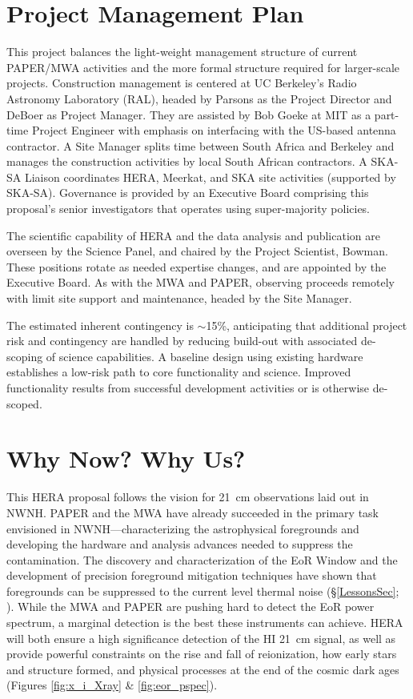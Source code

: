 \documentclass[preprint]{aastex}
\def\HI{{H{\small I }}}
\begin{document}
\vspace{-0.25in}
\section{Project Management Plan}
\label{PMPsec}

This project balances the light-weight management structure of current PAPER/MWA
activities and the more formal structure required for larger-scale projects.
Construction management is centered at UC Berkeley's Radio Astronomy Laboratory
(RAL), headed by Parsons as the Project Director and DeBoer as
Project Manager. They are assisted by Bob Goeke at MIT as a part-time
Project Engineer with emphasis on interfacing with the US-based
antenna contractor.  A Site Manager splits time between South Africa
and Berkeley and manages the construction activities by local South African
contractors. A SKA-SA Liaison coordinates HERA, Meerkat, and SKA site
activities (supported by SKA-SA). Governance is provided by an Executive Board comprising
this proposal's senior investigators that operates using
super-majority policies. 

The scientific capability of HERA and the data analysis and publication are
overseen by the Science Panel, and chaired by the Project Scientist, Bowman. These
positions rotate as needed expertise changes, and are appointed by the
Executive Board.  As with the MWA and PAPER, observing
proceeds remotely with limit site support
and maintenance, headed by the Site Manager.

The estimated inherent contingency is $\sim$15\%, anticipating that additional project 
risk and contingency are handled by reducing
build-out with associated de-scoping of science capabilities.
A baseline design using
existing hardware establishes a low-risk path to core functionality and science.  Improved functionality
results from successful development activities or is otherwise de-scoped.

\vspace{-0.25in}
\section{Why Now? Why Us?}

This HERA proposal follows the vision for 21~cm observations laid out in NWNH.
PAPER and the MWA have already succeeded in the primary task envisioned in
NWNH---characterizing the astrophysical foregrounds and developing the hardware
and analysis advances needed to suppress the contamination. The discovery and
characterization of the EoR Window and the development of precision foreground
mitigation techniques have shown that foregrounds can be suppressed to the current level
thermal noise (\S \ref{LessonsSec}; \citealt{parsons_et_al2013}). While the MWA
and PAPER are pushing hard to detect the EoR power spectrum, %
a marginal detection is the best these instruments can achieve.
HERA will both ensure a high significance detection of the \HI 21~cm signal, as
well as provide powerful constraints on the rise and fall of reionization, how
early stars and structure formed, and physical processes at the end of the
cosmic dark ages (Figures \ref{fig:x_i_Xray} \& \ref{fig:eor_pspec}).
\end{document}
